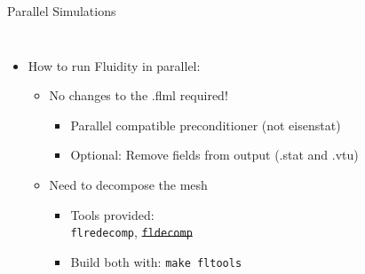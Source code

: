 \documentclass[t, hyperref={pdfpagelabels=false}]{beamer}
\begin{document}
\begin{frame}{Parallel Simulations}
  \begin{columns}[t]

    \begin{itemize}
    \item[] How to run Fluidity in parallel:
      \begin{itemize}
        \vspace{1em}
      \item No changes to the .flml required!
        \begin{itemize}
        \item Parallel compatible preconditioner (not eisenstat)
        \item Optional: Remove fields from output (.stat and .vtu)
        \end{itemize}

        \vspace{1em}
      \item Need to decompose the mesh
        \begin{itemize}
        \item Tools provided:
          \\\lstinline+flredecomp+, \sout{\lstinline+fldecomp+}
          \vspace{2pt}
        \item Build both with: \lstinline+make fltools+
        \end{itemize}
      \end{itemize}
    \end{itemize}

    \vspace{2em}
    \begin{figure}[ht] \centering
      \begin{tikzpicture}[scale=0.8]
        
      \end{tikzpicture}
    \end{figure}
  \end{columns}
\end{frame}
\end{document}
